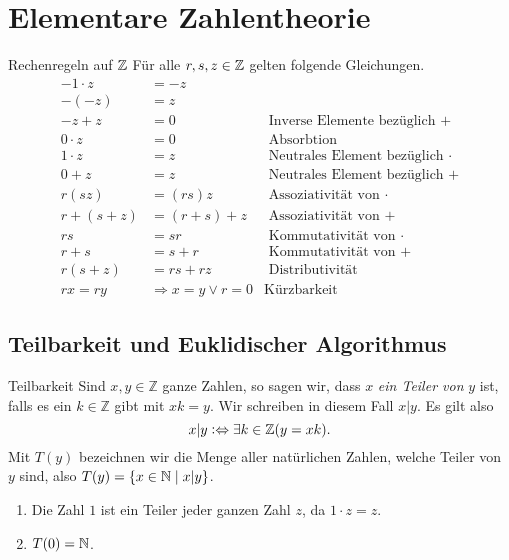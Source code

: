 \section{Elementare Zahlentheorie}

\begin{lemma}{Rechenregeln auf $\mathbb{Z}$}
    Für alle $r,s,z\in\mathbb{Z}$ gelten folgende Gleichungen.
    \begin{align*}
        -1\cdot z&=-z\\
        -(-z)&=z\\
        -z+z&=0 &\text{ Inverse Elemente bezüglich }+\\
        0\cdot z&=0 &\text{ Absorbtion}\\
        1\cdot z&=z &\text{ Neutrales Element bezüglich }\cdot\\
        0+z&=z &\text{ Neutrales Element bezüglich }+\\
        r(sz)&=(rs)z &\text{ Assoziativität von } \cdot\\
        r+(s+z)&=(r+s)+z &\text{ Assoziativität von }+\\
        rs&=sr &\text{ Kommutativität von }\cdot\\
        r+s&=s+r &\text{ Kommutativität von }+\\
        r(s+z)&=rs+rz &\text{ Distributivität}\\
        rx=ry&\Rightarrow x=y\lor r=0&\text{Kürzbarkeit}
    \end{align*}
\end{lemma}

\subsection{Teilbarkeit und Euklidischer Algorithmus}

\begin{definition}{Teilbarkeit}
    Sind $x,y\in\mathbb{Z}$ ganze Zahlen, so sagen wir, dass $x$ \textit{ein Teiler von} $y$ ist, falls es ein $k\in\mathbb{Z}$ gibt mit $xk=y$. Wir schreiben in diesem Fall $x|y$. Es gilt also
    \[
        x|y:\Leftrightarrow \exists k\in\mathbb{Z}(y=xk).
    \]
    Mit $T(y)$ bezeichnen wir die Menge aller natürlichen Zahlen, welche Teiler von $y$ sind, also $T(y)=\{x\in\mathbb{N}\mid x|y\}$.
\end{definition}

\begin{example}
    \begin{enumerate}
        \item Die Zahl $1$ ist ein Teiler jeder ganzen Zahl $z$, da $1\cdot z=z$.
        \item $T(0)=\mathbb{N}$.
    \end{enumerate}
\end{example}

